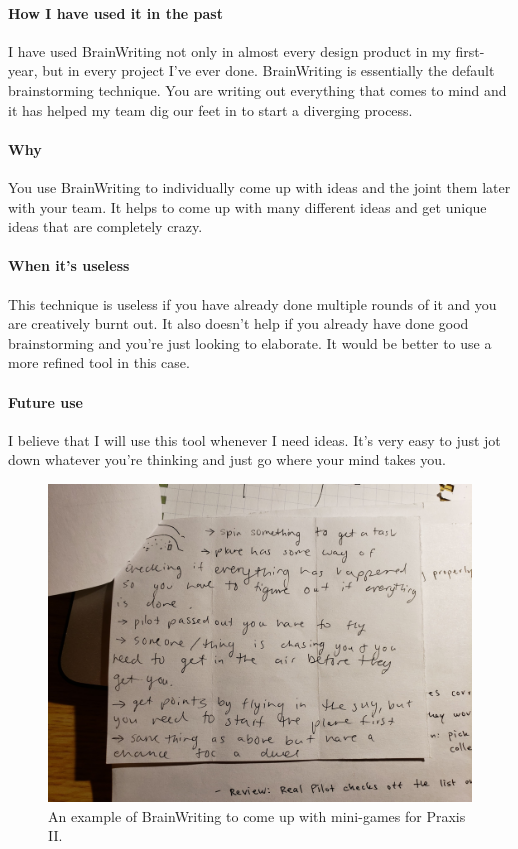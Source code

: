 \documentclass[paper=a4, fontsize=11pt]{article} %
\begin{document}
            \paragraph{How I have used it in the past}
            \cite{brainw} I have used BrainWriting not only in almost every design product in my first-year, but in every project I've ever done. BrainWriting is essentially the default brainstorming technique. You are writing out everything that comes to mind and it has helped my team dig our feet in to start a diverging process. 
            \paragraph{Why}
            You use BrainWriting to individually come up with ideas and the joint them later with your team. It helps to come up with many different ideas and get unique ideas that are completely crazy.
            \paragraph{When it's useless}
            This technique is useless if you have already done multiple rounds of it and you are creatively burnt out. It also doesn't help if you already have done good brainstorming and you're just looking to elaborate. It would be better to use a more refined tool in this case.
            \paragraph{Future use}
            I believe that I will use this tool whenever I need ideas. It's very easy to just jot down whatever you're thinking and just go where your mind takes you.
            \begin{figure}[H]
                \centering
	            \includegraphics[width=0.8\linewidth]{brain2.jpg}
	            \caption{An example of BrainWriting to come up with mini-games for Praxis II.}
            \end{figure}
            
\end{document}
